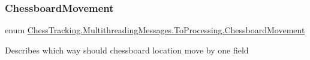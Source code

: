 \subsubsection{\texorpdfstring{ChessboardMovement}{ChessboardMovement}}
{\footnotesize\ttfamily enum \mbox{\hyperlink{namespace_chess_tracking_1_1_multithreading_messages_1_1_to_processing_af48751428f7a12d314dbbac688726bac}{Chess\+Tracking.\+Multithreading\+Messages.\+To\+Processing.\+Chessboard\+Movement}}\hspace{0.3cm}{\ttfamily [strong]}}



Describes which way should chessboard location move by one field 

